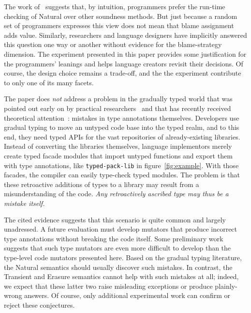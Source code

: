 
The work of~\citet{tgpk-dls-2018} suggests that, by intuition, programmers
prefer the run-time checking of Natural over other soundness methods. But just
because a random set of programmers expresses this view does not mean that blame
assignment adds value. Similarly, researchers and language designers have
implicitly answered this question one way or another without evidence for the
blame-strategy dimension. The experiment presented in this paper provides some
justification for the programmers' leanings and helps language creators revisit
their decisions. Of course, the design choice remains a trade-off, and the
the experiment contribute to only one of its many facets. 

The paper does {\em not\/} address a problem in the gradually typed world that
was pointed out early on by practical researchers~\cite{incorrect-ts,
sta-nt-base-types, wmwz-ecoop-2017} and that has recently received theoretical
attention~\cite{gfd-oopsla-2019, cc-oopsla-20}: mistakes in type annotations
themselves.  Developers use gradual typing to move an untyped code base into the
typed realm, and to this end, they need typed APIs for the vast repositories of
already-existing libraries. Instead of converting the libraries themselves,
language implementors merely create typed facade modules that import untyped
functions and export them with type annotations, like {\tt typed-pack-lib} in
figure~\ref{fig:example}.  With those facades, the compiler can easily
type-check typed modules. The problem is that these retroactive additions of
types to a library may result from a misunderstanding of the code. \emph{Any
retroactively ascribed type may thus be a mistake itself.}

The cited evidence suggests that this scenario is quite common and largely
unadressed.  A future evaluation must develop mutators that produce incorrect
type annotations without breaking the code itself. Some preliminary work
suggests that such type mutators are even more difficult to develop than the
type-level code mutators presented here. Based on the gradual typing literature,
the Natural semantics should usually discover such mistakes. In contrast, the
Transient and Erasure semantics cannot help with such mistakes at all; indeed,
we expect that these latter two raise misleading exceptions or produce
plainly-wrong answers.  Of course, only additional experimental work can confirm
or reject these conjectures.



